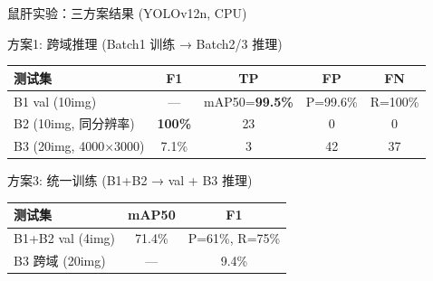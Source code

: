\documentclass[aspectratio=169, 10pt]{beamer}
\begin{document}
\begin{frame}{鼠肝实验：三方案结果 (YOLOv12n, CPU)}
  \begin{alertblock}{方案1: 跨域推理 (Batch1 训练 → Batch2/3 推理)}
    \begin{tabular}{lcccc}
      \toprule
      \textbf{测试集} & \textbf{F1} & \textbf{TP} & \textbf{FP} & \textbf{FN} \\
      \midrule
      B1 val (10img) & — & mAP50=\textbf{99.5\%} & P=99.6\% & R=100\% \\
      B2 (10img, 同分辨率) & \textbf{100\%} & 23 & 0 & 0 \\
      B3 (20img, 4000$\times$3000) & 7.1\% & 3 & 42 & 37 \\
      \bottomrule
    \end{tabular}
  \end{alertblock}
  \vspace{0em}
  \begin{block}{方案3: 统一训练 (B1+B2 → val + B3 推理)}
    \begin{tabular}{lcc}
      \toprule
      \textbf{测试集} & \textbf{mAP50} & \textbf{F1} \\
      \midrule
      B1+B2 val (4img) & 71.4\% & P=61\%, R=75\% \\
      B3 跨域 (20img) & — & 9.4\% \\
      \bottomrule
    \end{tabular}
  \end{block}
\end{frame}
\end{document}

